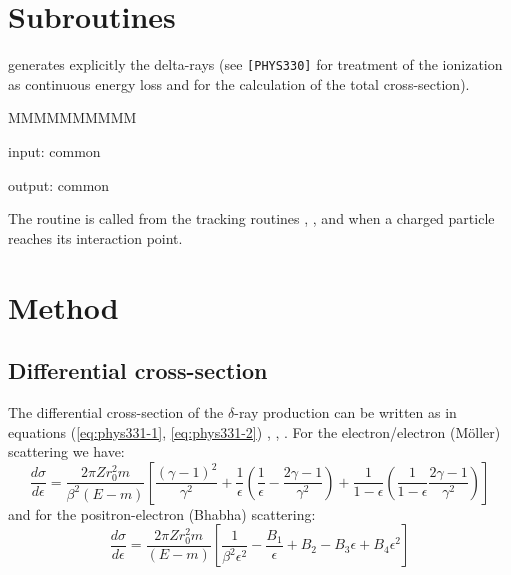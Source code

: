  
\section{Subroutines}
 generates explicitly the delta-rays (see
{\tt [PHYS330]} for treatment of the ionization as continuous energy loss
and for the calculation of the total cross-section).
\begin{DLtt}{MMMMMMMMMM}
\item[input:]  common 
\item[output:] common 
\end{DLtt}
The routine is called from the tracking routines
, ,  and  
when a charged particle reaches
its interaction point.
\section {Method }
\subsection{Differential cross-section}
The differential cross-section of the $\delta$-ray production can
be written as in equations (\ref{eq:phys331-1}, \ref{eq:phys331-2})
\cite{bib-MES1}, \cite{bib-EGS3}, \cite{bib-PDGB}. For the
electron/electron (M\"{o}ller) scattering we have:
\begin{equation}
\label{eq:phys331-1}
\frac{d\sigma }{d \epsilon }=\frac{2 \pi Z r^2 _0 m }{\beta^2 (E-m)}
\left[ \frac{(\gamma -1 )^2}  {\gamma^2 }+\frac{1}{\epsilon}
\left(\frac{1}{\epsilon}-\frac{2 \gamma -1 } {\gamma^2 } \right) +
\frac{1}{1- \epsilon}\left(\frac{1} {1- \epsilon} \frac{2 \gamma - 1}
{\gamma^2 }\right)  \right]
\end{equation}
and for the positron-electron (Bhabha) scattering:
\begin{equation}
\label{eq:phys331-2}
\frac{d \sigma}{d \epsilon}=\frac{2 \pi Z r^2_0 m }{(E-m)}\left[
\frac{1} {\beta^2 \epsilon^2}-\frac{B_1}{\epsilon}+B_2 - B_3 \epsilon
+ B_4 \epsilon^2\right]
 \end{equation}
 
